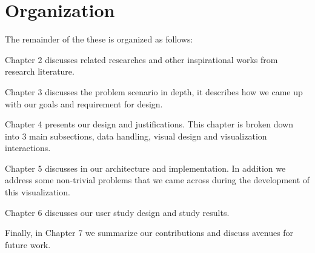  
\section{Organization}
The remainder of the these is organized as follows:
 
\noindent Chapter 2 discusses related researches and other inspirational works
from research literature.
 
\noindent Chapter 3 discusses the problem scenario in depth, it describes how
we came up with our goals and requirement for design.
 
\noindent Chapter 4 presents our design and justifications. This chapter is
broken down into 3 main subsections, data handling, visual design and
visualization interactions.
 
\noindent Chapter 5 discusses in our architecture and implementation. In
addition we address some non-trivial problems that we came across during the
development of this visualization.
 
\noindent Chapter 6 discusses our user study design and study results. 
 
\noindent Finally, in Chapter 7 we summarize our contributions and discuss
avenues for future work. 
  
 
  